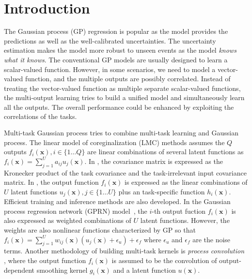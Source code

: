 \section{Introduction}

The Gaussian process (GP) regression is popular as the model provides the predictions as well as the well-calibrated uncertainties. The uncertainty estimation makes the model more robust to unseen events as the model \emph{knows what it knows}. The conventional GP models are usually designed to learn a scalar-valued function. However, in some scenarios, we need to model a vector-valued function, and the multiple outputs are possibly correlated. Instead of treating the vector-valued function as multiple separate scalar-valued functions, the multi-output learning \cite{zhang2017survey} tries to build a unified model and simultaneously learn all the outputs. The overall performance could be enhanced by exploiting the correlations of the tasks.

Multi-task Gaussian process \cite{vectorvaluedkernel} tries to combine multi-task learning and Gaussian process. The linear model of coreginalization (LMC) methods \cite{journel1978mining} assumes the $Q$ outputs $f_i(\bm{x}), i \in \{1\dots Q\}$ are linear combinations of several latent functions as $f_i(\bm{x}) = \sum_{j=1}^U a_{ij} u_j(\bm{x})$. In \cite{bonilla2008multi}, the covariance matrix is expressed as the Kronecker product of the task covariance and the task-irrelevant input covariance matrix. In \cite{nguyen2014collaborative}, the output function $f_i(\bm{x})$ is expressed as the linear combinations of $U$ latent functions $u_j(\bm{x}), j \in \{1\dots U\}$ plus an task-specific function $h_i(\bm{x})$. Efficient training and inference methods are also developed. In the Gaussian process regression network (GPRN) model~\cite{wilson2012gaussian}, the $i$-th output fuction $f_i(\bm{x})$ is also expressed as weighted combinations of $U$ latent functions. However, the weights are also nonlinear functions characterized by GP so that $f_i(\bm{x}) = \sum_{j=1}^U w_{ij}(\bm{x}) (u_j(\bm{x}) + \epsilon_u) + \epsilon_f$ where $\epsilon_u$ and $\epsilon_f$ are the noise terms. Another methodology of building multi-task kernels is \emph{process convolution} \cite{boyle2005dependent,alvarez2009sparse,alvarez2011computationally}, where the output function $f_i(\bm{x})$ is assumed to be the convolution of output-dependent smoothing kernel $g_i(\bm{x})$ and a latent function $u(\bm{x})$.

